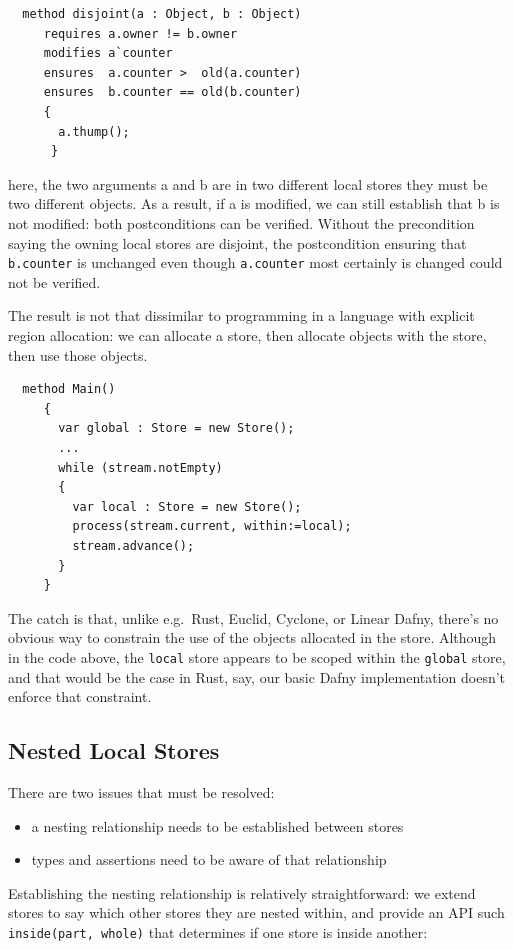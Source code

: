 \begin{lstlisting}
  method disjoint(a : Object, b : Object)
     requires a.owner != b.owner
     modifies a`counter
     ensures  a.counter >  old(a.counter)
     ensures  b.counter == old(b.counter)
     {
       a.thump();
      }
\end{lstlisting}

\noindent here, the two arguments a and b are in two different local stores 
they must be two different objects. As a result, if a is modified,
we can still establish that b is not modified: both postconditions can
be verified.  Without the precondition saying the owning local stores
are disjoint, the postcondition ensuring that \lstinline+b.counter+  is
unchanged even though  \lstinline+a.counter+ most certainly is changed
could not be verified.

The result is not that dissimilar to programming in a
language with explicit region allocation: we can allocate a store,
then allocate objects with the store, then use those objects.

\begin{lstlisting}
  method Main()
     {
       var global : Store = new Store();
       ...
       while (stream.notEmpty)
       {
         var local : Store = new Store();
         process(stream.current, within:=local);
         stream.advance();
       }
     }
\end{lstlisting}

The catch is that, unlike e.g.\ Rust, Euclid, Cyclone, or Linear Dafny,
there's no obvious way to constrain the use of the objects allocated
in the store. Although in the code above, the \lstinline+local+ store
appears to be scoped within the \lstinline+global+ store, and that
would be the case in Rust, say, our basic Dafny implementation doesn't
enforce that constraint.

\subsection{Nested Local Stores}

There are two issues that must be resolved:
\begin{itemize}
\item a nesting relationship needs to be established between stores
\item types and assertions need to be aware of that relationship
\end{itemize}

\noindent Establishing the nesting relationship is relatively straightforward: 
we extend stores to say which other stores they are nested within,
and provide an API such \lstinline+inside(part, whole)+ that determines
if one store is inside another:

